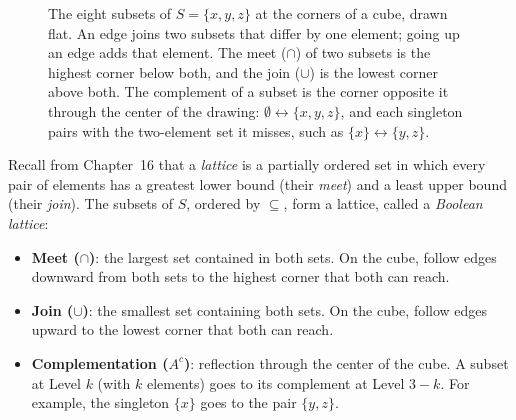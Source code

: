 \begin{figure}[htbp]
\caption{The eight subsets of $S = \{x, y, z\}$ at the corners of a cube, drawn flat. An edge joins two subsets that differ by one element; going up an edge adds that element. The meet ($\cap$) of two subsets is the highest corner below both, and the join ($\cup$) is the lowest corner above both. The complement of a subset is the corner opposite it through the center of the drawing: $\emptyset \leftrightarrow \{x, y, z\}$, and each singleton pairs with the two-element set it misses, such as $\{x\} \leftrightarrow \{y, z\}$.}
\label{31:fig-boolean-cube}
\end{figure}

Recall from Chapter~16 that a \emph{lattice} is a partially ordered set in which every pair of elements has a greatest lower bound (their \emph{meet}) and a least upper bound (their \emph{join}). The subsets of $S$, ordered by $\subseteq$, form a lattice, called a \emph{Boolean lattice}:
\begin{itemize}
  \item \textbf{Meet ($\cap$)}: the largest set contained in both sets. On the cube, follow edges downward from both sets to the highest corner that both can reach.
  \item \textbf{Join ($\cup$)}: the smallest set containing both sets. On the cube, follow edges upward to the lowest corner that both can reach.
  \item \textbf{Complementation ($A^c$)}: reflection through the center of the cube. A subset at Level $k$ (with $k$ elements) goes to its complement at Level $3-k$. For example, the singleton $\{x\}$ goes to the pair $\{y, z\}$.
\end{itemize}

